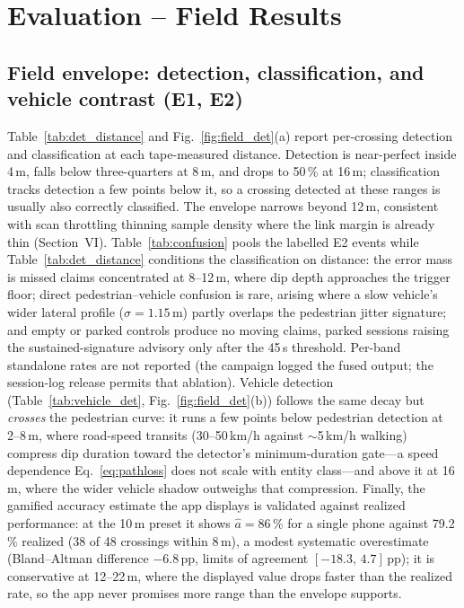 \documentclass[journal,10pt]{IEEEtran}
\begin{document}
\section{Evaluation -- Field Results}
\label{sec:results}

\subsection{Field envelope: detection, classification, and vehicle contrast (E1, E2)}
Table~\ref{tab:det_distance} and Fig.~\ref{fig:field_det}(a) report
per-crossing detection and classification at each tape-measured distance.
Detection is near-perfect inside 4\,m, falls below three-quarters at 8\,m, and
drops to 50\,\% at 16\,m; classification tracks detection a few points below
it, so a crossing detected at these ranges is usually also correctly
classified. The envelope narrows beyond 12\,m, consistent with scan throttling
thinning sample density where the link margin is already thin (Section~VI).
Table~\ref{tab:confusion} pools the labelled E2 events while
Table~\ref{tab:det_distance} conditions the classification on distance:
the error mass is missed claims concentrated at 8--12\,m, where dip depth
approaches the trigger floor; direct pedestrian--vehicle confusion is rare,
arising where a slow vehicle's wider lateral profile ($\sigma = 1.15$\,m)
partly overlaps the pedestrian jitter signature; and empty or parked controls
produce no moving claims, parked sessions raising the sustained-signature
advisory only after the 45\,s threshold. Per-band standalone rates are not reported (the campaign logged the
fused output; the session-log release permits that ablation). Vehicle detection
(Table~\ref{tab:vehicle_det}, Fig.~\ref{fig:field_det}(b)) follows the same
decay but \emph{crosses} the pedestrian curve: it runs a few points below
pedestrian detection at 2--8\,m, where road-speed transits (30--50\,km/h
against $\sim$5\,km/h walking) compress dip duration toward the detector's
minimum-duration gate---a speed dependence Eq.~\eqref{eq:pathloss} does not
scale with entity class---and above it at 16\,m, where the wider vehicle
shadow outweighs that compression. Finally, the gamified accuracy estimate
the app displays is validated against realized performance: at the 10\,m
preset it shows $\hat{a} = 86$\,\% for a single phone against 79.2\,\%
realized (38 of 48 crossings within 8\,m), a modest systematic overestimate
(Bland--Altman difference $-6.8$\,pp, limits of agreement
$[-18.3,\,4.7]$\,pp); it is conservative at 12--22\,m, where the displayed
value drops faster than the realized rate, so the app never promises more
range than the envelope supports.
\end{document}
